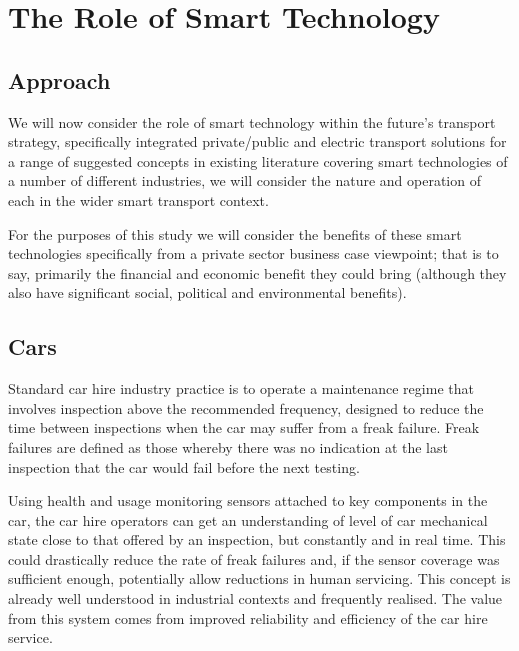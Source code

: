 \documentclass[conference]{IEEEtran}
\begin{document}
\section{The Role of Smart Technology}

\subsection{Approach}

We will now consider the role of smart technology within the future’s
transport strategy, specifically integrated private/public and
electric transport solutions for a range of suggested concepts in
existing literature covering smart technologies of a number of
different industries, we will consider the nature and operation of
each in the wider smart transport context.


For the purposes of this study we will consider the benefits of these
smart technologies specifically from a private sector business case
viewpoint; that is to say, primarily the financial and economic
benefit they could bring (although they also have significant social,
political and environmental benefits).

\subsection{Cars}

Standard car hire industry practice is to operate a maintenance regime
that involves inspection above the recommended frequency, designed to
reduce the time between inspections when the car may suffer from a
freak failure. Freak failures are defined as those whereby there was
no indication at the last inspection that the car would fail before
the next testing.

Using health and usage monitoring sensors attached to key components
in the car, the car hire operators can get an understanding of level
of car mechanical state close to that offered by an inspection, but
constantly and in real time. This could drastically reduce the rate of
freak failures and, if the sensor coverage was sufficient enough,
potentially allow reductions in human servicing.  This concept is
already well understood in industrial contexts and frequently
realised. The value from this system comes from improved reliability
and efficiency of the car hire service.
\end{document}
